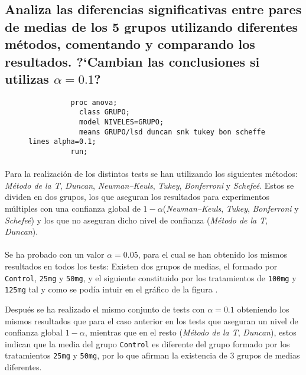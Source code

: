\documentclass{article}
\begin{document}
    \subsection{Analiza las diferencias significativas entre pares de medias de los 5 grupos utilizando diferentes métodos, comentando y comparando los resultados. ?`Cambian las conclusiones si utilizas $\alpha = 0.1$?}

      \begin{figure}[h]
        \centering
        \begin{verbatim}
          proc anova;
            class GRUPO;
            model NIVELES=GRUPO;
            means GRUPO/lsd duncan snk tukey bon scheffe lines alpha=0.1;
          run;
        \end{verbatim}
        \caption{}
        \label{code:sas_5}
      \end{figure}

      \paragraph{}
      Para la realización de los distintos tests se han utilizando los siguientes métodos: \emph{Método de la T}, \emph{Duncan}, \emph{Newman–Keuls}, \emph{Tukey}, \emph{Bonferroni} y \emph{Schefeé}. Estos se dividen en dos grupos, los que aseguran los resultados para experimentos múltiples con una confianza global de $1-\alpha$(\emph{Newman–Keuls}, \emph{Tukey}, \emph{Bonferroni} y \emph{Schefeé}) y los que no aseguran dicho nivel de confianza (\emph{Método de la T}, \emph{Duncan}).

      \paragraph{}
      Se ha probado con un valor $\alpha = 0.05$, para el cual se han obtenido los mismos resultados en todos los tests: Existen dos grupos de medias, el formado por \texttt{Control}, \texttt{25mg} y \texttt{50mg}, y el siguiente constituido por los tratamientos de \texttt{100mg} y \texttt{125mg} tal y como se podía intuir en el gráfico de la figura \label{fig:figura_1}.

      Después se ha realizado el mismo conjunto de tests con $\alpha = 0.1$ obteniendo los mismos resultados que para el caso anterior en los tests que aseguran un nivel de confianza global $1-\alpha$, mientras que en el resto (\emph{Método de la T}, \emph{Duncan}), estos indican que la media del grupo \texttt{Control} es diferente del grupo formado por los tratamientos \texttt{25mg} y \texttt{50mg}, por lo que afirman la existencia de 3 grupos de medias diferentes.
\end{document}

